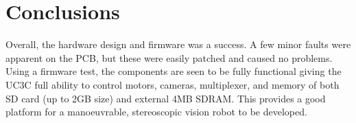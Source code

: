 \section{Conclusions}

Overall, the hardware design and firmware was a success. A few minor faults were apparent on the PCB, but these were easily patched and caused no problems. Using a firmware test, the components are seen to be fully functional giving the UC3C full ability to control motors, cameras, \itc multiplexer, and memory of both SD card (up to 2GB size) and external 4MB SDRAM. This provides a good platform for a manoeuvrable, stereoscopic vision robot to be developed. 
